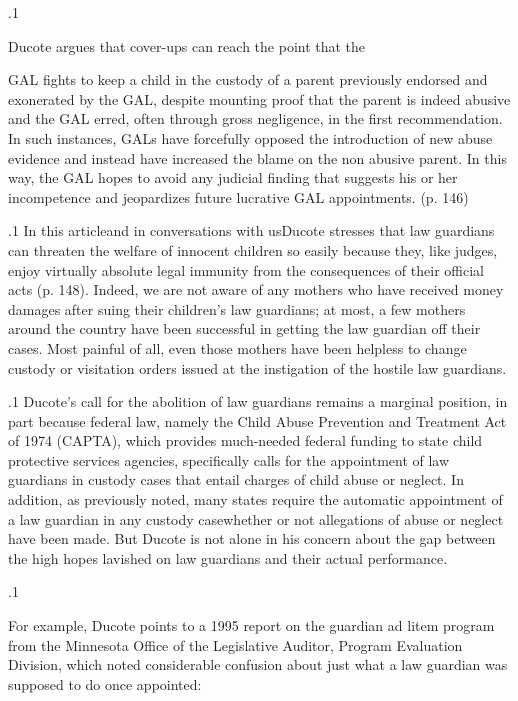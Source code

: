 \documentclass[11pt, twoside]{article}
\begin{document}
{\p.1{%
Ducote argues that cover-ups can reach the point that the

\begin{blockQuote}
GAL fights to keep a child in the custody of a parent previously endorsed and exonerated by the GAL, despite mounting proof that
the parent is indeed abusive and the GAL erred, often through
gross negligence, in the first recommendation. In such instances,
GALs have forcefully opposed the introduction of new abuse evidence and instead have increased the blame on the non abusive
parent. In this way, the GAL hopes to avoid any judicial finding that
suggests his or her incompetence and jeopardizes future lucrative
GAL appointments. (p. 146)
\end{blockQuote}

}%

\p.1{%
In this article\mdash{}and in conversations with us\mdash{}Ducote stresses that
law guardians can threaten the welfare of innocent children so easily
because they, like judges, enjoy virtually absolute legal immunity from
the consequences of their official acts (p. 148). Indeed, we are not aware
of any mothers who have received money damages after suing their
children’s law guardians; at most, a few mothers around the country
have been successful in getting the law guardian off their cases. Most
painful of all, even those mothers have been helpless to change custody
or visitation orders issued at the instigation of the hostile law guardians.
}%

\p.1{%
Ducote’s call for the abolition of law guardians remains a marginal position, in part because federal law, namely the Child Abuse Prevention
and Treatment Act of 1974 (CAPTA), which provides much-needed
federal funding to state child protective services agencies, specifically
calls for the appointment of law guardians in custody cases that entail charges of child abuse or neglect. In addition, as previously noted,
many states require the automatic appointment of a law guardian in
any custody case\mdash{}whether or not allegations of abuse or neglect have
been made. But Ducote is not alone in his concern about the gap
between the high hopes lavished on law guardians and their actual
performance.
}%

\p.1{%
For example, Ducote points to a 1995 report on the guardian ad litem
program from the Minnesota Office of the Legislative Auditor, Program Evaluation Division, which noted considerable confusion about
just what a law guardian was supposed to do once appointed:

}}
\end{document}
